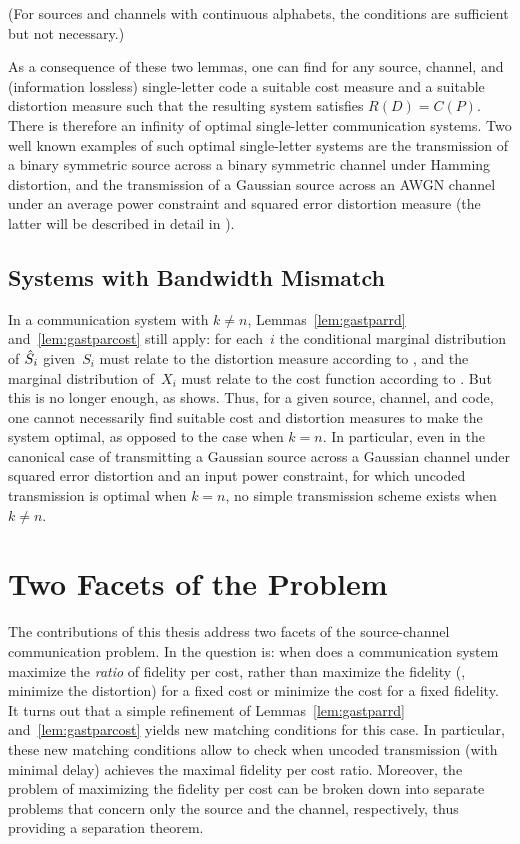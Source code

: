 (For sources and channels with continuous alphabets, the conditions are
sufficient but not necessary.)

As a consequence of these two lemmas, one can find for any source, channel, and
(information lossless) single-letter code a suitable cost measure and a suitable
distortion measure such that the resulting system satisfies $R(D) = C(P)$. There
is therefore an infinity of optimal single-letter communication systems. Two
well known examples of such optimal single-letter systems are the transmission
of a binary symmetric source across a binary symmetric channel under Hamming
distortion, and the transmission of a Gaussian source across an AWGN channel
under an average power constraint and squared error distortion measure (the
latter will be described in detail in ).


\subsection{Systems with Bandwidth Mismatch}

In a communication system with $k \ne n$, Lemmas~\ref{lem:gastparrd}
and~\ref{lem:gastparcost} still apply: for each~$i$ the conditional marginal
distribution of ${\hat{S}}_i$ given~$S_i$ must relate to the distortion measure
according to , and the marginal distribution of~$X_i$ must
relate to the cost function according to . But this is no
longer enough, as  shows. Thus, for a given source,
channel, and code, one cannot necessarily find suitable cost and distortion
measures to make the system optimal, as opposed to the case when $k = n$.  In
particular, even in the canonical case of transmitting a Gaussian source across
a Gaussian channel under squared error distortion and an input power constraint,
for which uncoded transmission is optimal when $k = n$, no simple transmission
scheme exists when $k \ne n$.


\section{Two Facets of the Problem}\label{sec:twofacets}

The contributions of this thesis address two facets of the source-channel
communication problem. In  the question is: when does a
communication system maximize the \emph{ratio} of fidelity per cost, rather than
maximize the fidelity (\ie, minimize the distortion) for a fixed cost or
minimize the cost for a fixed fidelity.  It turns out that a simple refinement
of Lemmas~\ref{lem:gastparrd} and~\ref{lem:gastparcost} yields new matching
conditions for this case. In particular, these new matching conditions allow to
check when uncoded transmission (with minimal delay) achieves the maximal
fidelity per cost ratio. Moreover, the problem of maximizing the fidelity per
cost can be broken down into separate problems that concern only the source and
the channel, respectively, thus providing a separation theorem. 


